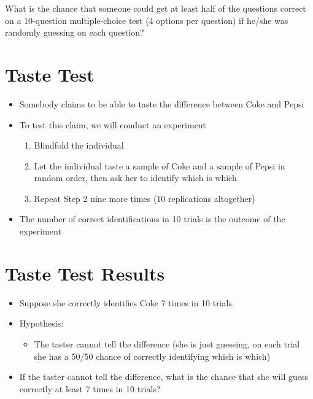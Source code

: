 \documentclass[12pt]{article}
\begin{document}
What is the chance that someone could get at least half of the questions
correct on a 10-question multiple-choice test (4 options per question)
if he/she was randomly guessing on each question?

\section{Taste Test}\label{taste-test}

\begin{itemize}
\itemsep1pt\parskip0pt
\item
  Somebody claims to be able to taste the difference between Coke and
  Pepsi
\item
  To test this claim, we will conduct an experiment

  \begin{enumerate}
  \def\labelenumi{\arabic{enumi}.}
  \itemsep1pt\parskip0pt
  \item
    Blindfold the individual
  \item
    Let the individual taste a sample of Coke and a sample of Pepsi in
    random order, then ask her to identify which is which
  \item
    Repeat Step 2 nine more times (10 replications altogether)
  \end{enumerate}
\item
  The number of correct identifications in 10 trials is the outcome of
  the experiment
\end{itemize}

\section{Taste Test Results}\label{taste-test-results}

\begin{itemize}
\itemsep1pt\parskip0pt
\item
  Suppose she correctly identifies Coke 7 times in 10 trials.
\item
  Hypothesis:

  \begin{itemize}
  \itemsep1pt\parskip0pt
  \item
    The taster cannot tell the difference (she is just guessing, on each
    trial she has a 50/50 chance of correctly identifying which is
    which)
  \end{itemize}
\item
  If the taster cannot tell the difference, what is the chance that she
  will guess correctly at least 7 times in 10 trials?
\end{itemize}
\end{document}
